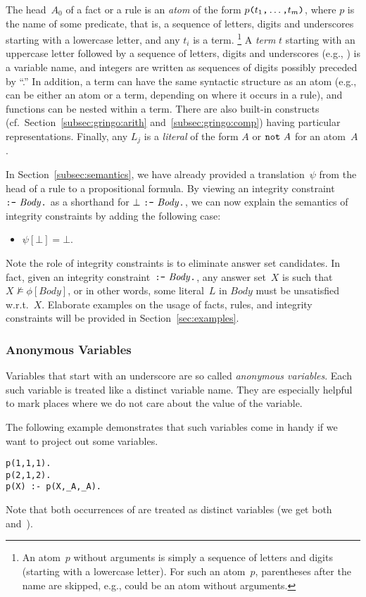 \noindent
The head~$A_0$ of a fact or a rule is an \emph{atom} of the form
$p\texttt{(}t_1\texttt{,}\dots\texttt{,}t_m\texttt{)}$,
where $p$ is the name of some predicate, that is, a sequence of letters, digits and underscores 
starting with a lowercase letter,
and any $t_i$ is a term.%
\footnote{An atom~$p$ without arguments is simply a sequence of letters and digits
  (starting with a lowercase letter).
  For such an atom~$p$, parentheses after the name are skipped, e.g.,
   could be an atom without arguments.}
A \emph{term} $t$ starting with an uppercase letter followed by
a sequence of letters, digits and underscores (e.g., ) is a variable name,
and integers are written as sequences of digits possibly preceded by ``\code{-}.''
In addition, a term can have the same syntactic structure as an atom
(e.g., 
 can be either an atom or a term, depending on where it occurs in a rule),
and functions can be nested within a term.
There are also built-in constructs
(cf.\ Section~\ref{subsec:gringo:arith} and~\ref{subsec:gringo:comp})
having particular representations.
Finally, any $L_j$ is a \emph{literal} of the form $A$ or $\texttt{not}~A$
for an atom~$A$.

In Section~\ref{subsec:semantics},
we have already provided a translation~$\psi$
from the head of a rule to a propositional formula.
By viewing an integrity constraint
$\texttt{:-}~\mathit{Body}\texttt{.}$ as a shorthand for $\bot~\texttt{:-}~\mathit{Body}\texttt{.}$,
we can now explain the semantics of integrity constraints by adding the following case:
\begin{itemize}
\item $\psi[\bot]=\bot$.
\end{itemize}
Note the role of integrity constraints is to eliminate answer set candidates.
In fact, given an integrity constraint~$\texttt{:-}~\mathit{Body}\texttt{.}$,
any answer set~$X$ is such that $X\not\models\phi[\mathit{Body}]$, or
in other words, some literal~$L$ in $\mathit{Body}$ must be unsatisfied w.r.t.~$X$.
Elaborate examples on the usage of facts, rules, and integrity constraints
will be provided in Section~\ref{sec:examples}.

\begin{newstuff}
\subsubsection{Anonymous Variables}
Variables that start with an underscore are so called \emph{anonymous variables}.
Each such variable is treated like a distinct variable name.
They are especially helpful to mark places where we do not care about the value of the variable.
\begin{example}
The following example demonstrates that such variables come in handy
if we want to project out some variables.
\begin{lstlisting}
p(1,1,1).
p(2,1,2).
p(X) :- p(X,_A,_A).
\end{lstlisting}
Note that both occurrences of  are treated as distinct variables (we get both~ and~).
\end{example}
\end{newstuff}


